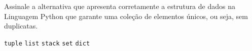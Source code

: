 
{%

\item \rtask \ponto{\pt} 
Assinale a alternativa que apresenta corretamente a estrutura de dados na Linguagem Python que garante uma coleção de elementos únicos, ou seja, sem duplicatas.  

\begin{answerlist}[label={\texttt{\Alph*}.},leftmargin=*]
    \ti \texttt{tuple}
    \ti \texttt{list}
    \ti \texttt{stack}
    \di \texttt{set}
    \ti \texttt{dict}
\end{answerlist}

}





